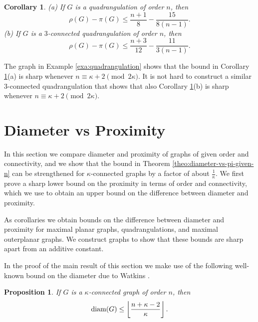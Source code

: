 \documentclass[a4paper,11pt]{article}
\newtheorem{proposition}[theorem]%
{Proposition}
\newtheorem{corollary}[theorem]%
{Corollary}
\begin{document}
\begin{corollary}\label{coro:remotness-proximity-in-quadrangulation}
(a)  If $G$ is a quadrangulation of order $n$, then 
  \[
\rho(G) - \pi(G) \leq \frac{n+1}{8}  - \dfrac{15}{8(n-1)}.
\]
(b)  If $G$ is a $3$-connected quadrangulation of order $n$, then 
  \[
\rho(G) - \pi(G) \leq \frac{n+3}{12}  - \frac{11}{3(n-1)}.
\]
\end{corollary}
  
The graph in Example \ref{exa:quadrangulation} shows that the bound in 
Corollary \ref{coro:remotness-proximity-in-quadrangulation}(a) is sharp whenever 
$n \equiv \kappa+2 \pmod{2\kappa}$. 
It is not hard to construct a similar $3$-connected quadrangulation that shows that also
Corollary \ref{coro:remotness-proximity-in-quadrangulation}(b) is sharp whenever 
$n \equiv \kappa+2 \pmod{2\kappa}$.
  
  
  

  

  

 
 
 
\section{Diameter vs Proximity}
\label{section:diameter-vs-proximity}

 
In this section we compare diameter and proximity of graphs of given order and connectivity,
and we show that the bound in Theorem \ref{theo:diameter-vs-pi-given-n} can be strengthened 
for $\kappa$-connected graphs by a factor of about $\frac{1}{\kappa}$. 
We first prove a sharp lower bound on the proximity in terms of order and connectivity, 
which we use to obtain an upper bound on the difference between diameter and proximity. 


As corollaries we obtain bounds on the difference between diameter and proximity for maximal planar graphs, 
quadrangulations, and maximal outerplanar graphs. We construct graphs to show that these bounds are sharp
apart from an additive constant. 

In the proof of the main result of this section we make use of the following well-known
bound on the diameter due to Watkins \cite{Wat1967}. 

\begin{proposition} \cite{Wat1967}  \label{prop:diam-kappa-connected} 
If $G$ is a $\kappa$-connected graph of order $n$, then 
\[ {\rm diam}(G) \leq \left\lfloor \frac{n + \kappa - 2}{\kappa} \right\rfloor. \]
\end{proposition}
\end{document}
